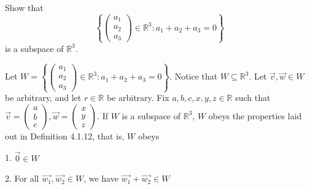 \documentclass[12pt]{article}
\newenvironment{problem}[2][Problem]
{
	\begin{trivlist} 
		\item[\hskip \labelsep {\bfseries #1 #2:}]
	}
{
	\end{trivlist}
	}
\newenvironment{solution}[1][Solution]
{
	\begin{trivlist} 
		\item[\hskip \labelsep {\itshape #1:}]
	}
	{
	\end{trivlist}
}
\begin{document}
\newpage
\begin{problem}{5}
Show that
\[
\left\{ \begin{pmatrix}a_1\\a_2\\a_3\end{pmatrix} \in \mathbb{R}^3 : a_1 + a_2 + a_3 = 0 \right\}
\]
is a subspace of $\mathbb{R}^3$.
\noindent
\newline
\newline
\begin{solution}
Let $W=\left\{ \begin{pmatrix}a_1\\a_2\\a_3\end{pmatrix} \in \mathbb{R}^3 : a_1 + a_2 + a_3 = 0 \right\}$. Notice that $W \subseteq \mathbb{R}^3$. Let $\vec{v},\vec{w} \in W$ be arbitrary, and let $r \in \mathbb{R}$ be arbitrary. Fix $a,b,c,x,y,z\in \mathbb{R}$ such that $\vec{v} =  \begin{pmatrix} a\\b\\c \end{pmatrix}, \vec{w}= \begin{pmatrix}x\\y\\z\end{pmatrix}$.
If $W$ is a subspace of $\mathbb{R}^3$, $W$ obeys the properties laid out in Definition 4.1.12, that is, $W$ obeys

1. $\vec{0} \in W$

2. For all $\vec{w_1},\vec{w_2} \in W$, we have $\vec{w_1}+\vec{w_2} \in W$


\end{solution}
\end{problem}
\end{document}
